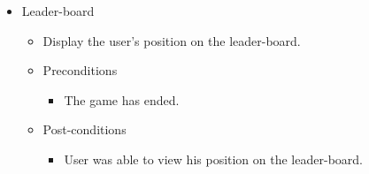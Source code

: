 \documentclass{article}
\begin{document}
	\begin{itemize}
		\item Leader-board
			\begin{itemize}
				\item Display the user's position on the leader-board.
				\item Preconditions
				\begin{itemize}	
					\item The game has ended.
				\end{itemize}
				\item Post-conditions
				\begin{itemize}	
					\item User was able to view his position on the leader-board.
				\end{itemize}
			\end{itemize}
	\end{itemize}
	
\end{document}
